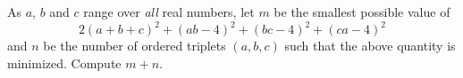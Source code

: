 As $a$, $b$ and $c$ range over \emph{all} real numbers, let $m$ be the smallest possible value of $$2\left(a+b+c\right)^2+\left(ab-4\right)^2+\left(bc-4\right)^2+\left(ca-4\right)^2$$ and $n$ be the number of ordered triplets $\left(a,b,c\right)$ such that the above quantity is minimized. Compute $m+n$.